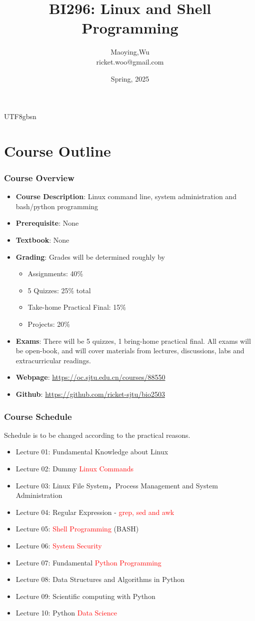 \documentclass[red]{beamer}
\title[BI296]{BI296: Linux and Shell Programming}
\author[Maoying Wu]{Maoying,Wu\\
{\scriptsize ricket.woo@gmail.com}}
\institute[CBB] %
{
  \inst{}
  Dept. of Bioinformatics \& Biostatistics\\
  Shanghai Jiao Tong University
}
\date{Spring, 2025}
\begin{document}
\begin{CJK*}{UTF8}{gbsn}
\frame{\titlepage}

\section[Outline]{Course Outline}
\begin{frame}
\frametitle{Course Overview}
\begin{itemize}
	\item \textbf{Course Description}: Linux command line, system administration and 
		bash/python programming
	\item \textbf{Prerequisite}: None
    \item \textbf{Textbook}: None
    \item \textbf{Grading}: Grades will be determined roughly by
    \begin{itemize}
		\item Assignments: 40\%
        \item 5 Quizzes: 25\% total
        \item Take-home Practical Final: 15\%
        \item Projects: 20\%
    \end{itemize}
    \item \textbf{Exams}: There will be 5 quizzes, 1 bring-home practical final.
        All exams will be open-book, and will cover materials from lectures, 
			discussions, labs and extracurricular readings.

    \item \textbf{Webpage}: \url{https://oc.sjtu.edu.cn/courses/88550}
	 \item \textbf{Github}: \url{https://github.com/ricket-sjtu/bio2503}
\end{itemize}
\end{frame}

\begin{frame}
\frametitle{Course Schedule}
Schedule is to be changed according to the practical reasons.
\begin{itemize}
	\item Lecture 01: Fundamental Knowledge about Linux
	\item Lecture 02: Dummy \textcolor{red}{Linux Commands}
	\item Lecture 03: Linux File System，Process Management and System Administration
	\item Lecture 04: Regular Expression - \textcolor{red}{grep, sed and awk}
	\item Lecture 05: \textcolor{red}{Shell Programming} (BASH)
	\item Lecture 06: \textcolor{red}{System Security}
	\item Lecture 07: Fundamental \textcolor{red}{Python Programming}
	\item Lecture 08: Data Structures and Algorithms in Python
	\item Lecture 09: Scientific computing with Python
	\item Lecture 10: Python \textcolor{red}{Data Science}
\end{itemize}
\end{frame}



\end{CJK*}
\end{document}
